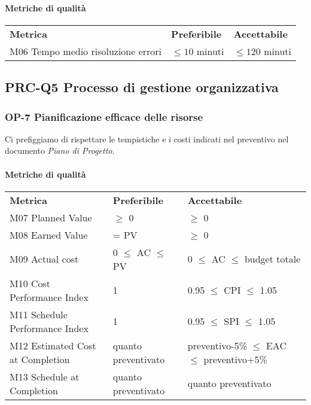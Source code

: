 			\paragraph{Metriche di qualità} \mbox{}			
			\begin{longtable} {
					>{}p{80mm} 
					>{}p{25mm}
					>{}p{25mm}
				}
				\rowcolor{gray!50}
				\textbf{Metrica} & \textbf{Preferibile} & \textbf{Accettabile} \TBstrut \TBstrut \\
				M06 Tempo medio risoluzione errori & $\le 10$ minuti & $\le 120$ minuti \TBstrut \\ [2mm]
			\end{longtable}					

	\subsection{PRC-Q5 Processo di gestione organizzativa}
		\subsubsection{OP-7 Pianificazione efficace delle risorse}
			Ci prefiggiamo di rispettare le tempistiche e i costi indicati nel preventivo nel documento \textit{Piano di Progetto}.
			\paragraph{Metriche di qualità} \mbox{} 
			\begin{longtable} {
					>{}p{60mm} 
					>{}p{35mm}
					>{}p{50mm}
				}
				\rowcolor{gray!50}
				\textbf{Metrica} & \textbf{Preferibile} & \textbf{Accettabile} \TBstrut \TBstrut \\
				M07 Planned Value & $\ge$ 0 & $\ge$ 0 \TBstrut \\ [2mm]
				M08 Earned Value & = PV & $\ge$ 0 \TBstrut \\ [2mm]
				M09 Actual cost & 0 $\le$ AC $\le$ PV &0 $\le$ AC $\le$ budget totale \TBstrut \\ [2mm]				
				M10 Cost Performance Index & 1 & 0.95 $\le$ CPI $\le$ 1.05 \TBstrut \\ [2mm]				
				M11 Schedule Performance Index & 1 & 0.95 $\le$ SPI $\le$ 1.05 \TBstrut \\ [2mm]				
				M12 Estimated Cost at Completion & quanto preventivato & preventivo-5\% $\le$ EAC $\le$ preventivo+5\% \TBstrut \\ [2mm]
				M13 Schedule at Completion & quanto preventivato & quanto preventivato \TBstrut \\ [2mm]				
			\end{longtable}

